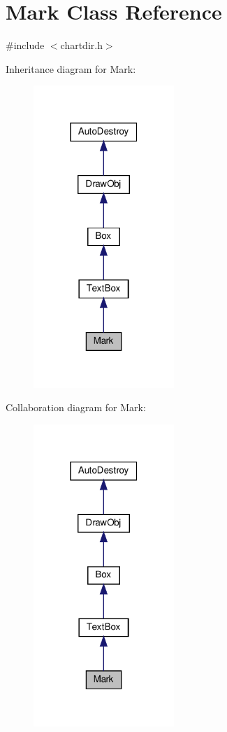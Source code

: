 \hypertarget{class_mark}{}\section{Mark Class Reference}
\label{class_mark}


{\ttfamily \#include $<$chartdir.\+h$>$}



Inheritance diagram for Mark\+:
\nopagebreak
\begin{figure}[H]
\begin{center}
\leavevmode
\includegraphics[width=151pt]{class_mark__inherit__graph}
\end{center}
\end{figure}


Collaboration diagram for Mark\+:
\nopagebreak
\begin{figure}[H]
\begin{center}
\leavevmode
\includegraphics[width=151pt]{class_mark__coll__graph}
\end{center}
\end{figure}
